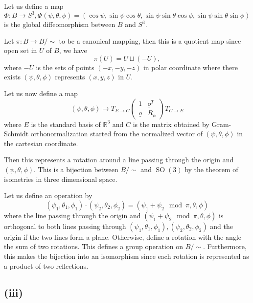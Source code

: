 \documentclass{article}
\numberwithin{equation}{section}
\DeclareMathOperator{\SO}{SO}
\begin{document}
Let us define a map
\begin{equation*}
\Phi:B\to S^3, \Phi(\psi,\theta,\phi) = (\cos\psi,\sin\psi\cos\theta,\sin\psi\sin\theta\cos\phi,\sin\psi\sin\theta\sin\phi)
\end{equation*}
is the global diffeomorphism between $B$ and $S^3$. \\
\par Let $\pi:B\to B/\sim$ to be a canonical mapping, then this is a quotient map since open set in $U$ of $B$, we have
\begin{equation*}
\pi(U) = U\sqcup (-U),
\end{equation*}
where $-U$ is the sets of points $(-x,-y,-z)$ in polar coordinate where there exists $(\psi,\theta,\phi)$ represents $(x,y,z)$ in $U$.\\
\par Let us now define a map 
\begin{equation*}
(\psi,\theta,\phi)\mapsto
T_{E\to C}
\begin{pmatrix}
1&\underline{o}^T\\
\underline{o}&R_\psi
\end{pmatrix}
T_{C\to E}
\end{equation*}
where $E$ is the standard basis of $\mathbb{R}^3$ and $C$ is the matrix obtained by Gram-Schmidt orthonormalization started from the normalized vector of $(\psi,\theta,\phi)$ in the cartesian coordinate. \\
\par Then this represents a rotation around a line passing through the origin and $(\psi,\theta,\phi)$. This is a bijection between $B/\sim$ and $\SO(3)$ by the theorem of isometries in three dimensional space.\\
\par Let us define an operation by 
\begin{equation*}
(\psi_1,\theta_1,\phi_1)\cdot(\psi_2,\theta_2,\phi_2) = (\psi_1+\psi_2\mod \pi,\theta,\phi)
\end{equation*}
where the line passing through the origin and $(\psi_1+\psi_2\mod \pi,\theta,\phi)$ is orthogonal to both lines passing through $(\psi_1,\theta_1,\phi_1),(\psi_2,\theta_2,\phi_2)$ and the origin if the two lines form a plane. Otherwise, define a rotation with the angle the sum of two rotations. This defines a group operation on $B/\sim$. Furthermore, this makes the bijection into an isomorphism since each rotation is represented as a product of two reflections. 

\subsection*{(iii)}
\end{document}
